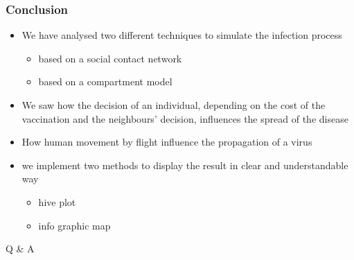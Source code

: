 \documentclass{beamer}
\begin{document}
\begin{frame}
\frametitle{Conclusion}
\begin{itemize}
\item We have analysed two different techniques to simulate the infection process
\begin{itemize}
\item based on a social contact network 
\item based on a compartment model
\end{itemize}
\item We saw how the decision of an individual, depending on the cost of the vaccination and the neighbours' decision, influences the spread of the disease
\item How human movement by flight influence the propagation of a virus
\item we implement two methods to display the result in clear and understandable way
\begin{itemize}
\item hive plot
\item info graphic map
\end{itemize}
\end{itemize}
\end{frame}



\begin{frame}
\Huge{\centerline{Q \& A}}
\end{frame}

\end{document}
